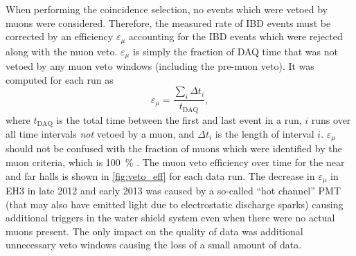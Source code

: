 When performing the coincidence selection, no events which were vetoed by muons
were considered.
Therefore, the measured rate of IBD events
must be corrected by an efficiency $\varepsilon_\mu$
accounting for the IBD events which were rejected along with the muon veto.
$\varepsilon_\mu$ is simply the fraction of DAQ time
that was not vetoed by any muon veto windows (including the pre-muon veto).
It was computed for each run as
\begin{equation}\label{eq:muon_eff}
    \varepsilon_\mu = \frac{\sum_i \Delta t_i}{t_{\text{DAQ}}},
\end{equation}
where $t_{\text{DAQ}}$ is the total time
between the first and last event in a run,
$i$ runs over all time intervals \textit{not} vetoed by a muon,
and $\Delta t_i$ is the length of interval $i$.
$\varepsilon_\mu$ should not be confused
with the fraction of muons which were identified by the muon criteria,
which is \SI{100}{\percent} \cite{muonsystem2015}.
The muon veto efficiency over time for the near and far halls
is shown in \cref{fig:veto_eff} for each data run.
The decrease in $\varepsilon_\mu$ in EH3 in late 2012 and early 2013
was caused by a so-called ``hot channel'' PMT (that may also have
emitted light due to electrostatic discharge sparks)
causing additional triggers in the water shield system
even when there were no actual muons present.
The only impact on the quality of data was additional unnecessary veto windows
causing the loss of a small amount of data.

